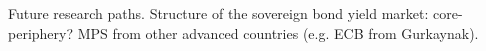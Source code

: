 {Future research paths. Structure of the sovereign bond yield market: core-periphery? MPS from other advanced countries (e.g. ECB from Gurkaynak).




}
